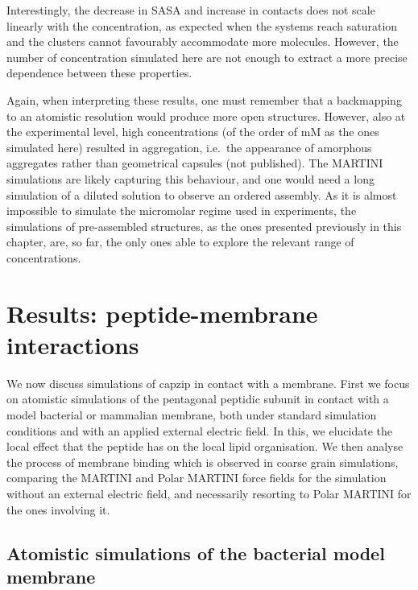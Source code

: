 Interestingly, the decrease in SASA and increase in contacts does not scale linearly with the concentration, as expected when the systems reach saturation and the clusters cannot favourably accommodate more molecules. However, the number of concentration simulated here are not enough to extract a more precise dependence between these properties.

Again, when interpreting these results, one must remember that a backmapping to an atomistic resolution would produce more open structures. However, also at the experimental level, high concentrations (of the order of mM as the ones simulated here) resulted in aggregation, i.e.\ the appearance of amorphous aggregates rather than geometrical capsules (not published). The MARTINI simulations are likely capturing this behaviour, and one would need a long simulation of a diluted solution to observe an ordered assembly. As it is almost impossible to simulate the micromolar regime used in experiments, the simulations of pre-assembled structures, as the ones presented previously in this chapter, are, so far, the only ones able to explore the relevant range of concentrations.


\section{Results: peptide-membrane interactions}

We now discuss simulations of capzip in contact with a membrane. First we focus on atomistic simulations of the pentagonal peptidic subunit in contact with a model bacterial or mammalian membrane, both under standard simulation conditions and with an applied external electric field. In this, we elucidate the local effect that the peptide has on the local lipid organisation.
%
We then analyse the process of membrane binding which is observed in coarse grain simulations, comparing the MARTINI and Polar MARTINI force fields for the simulation without an external electric field, and necessarily resorting to Polar MARTINI for the ones involving it. 


\subsection{Atomistic simulations of the bacterial model membrane} \label{sec:lip_atom_bact}

